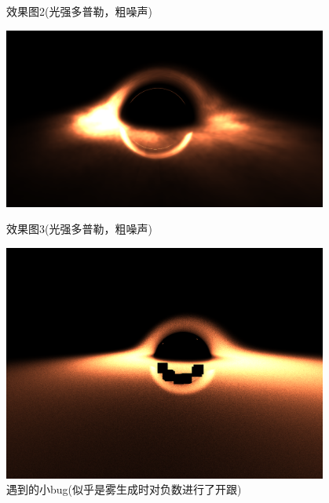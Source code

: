 \documentclass[a4paper, 12pt]{article}
\begin{document}
\begin{figure}[H]
\begin{minipage}[t]{0.48\textwidth}
            \caption{效果图2(光强多普勒，粗噪声)}
        \end{minipage}
        \hfill
        \begin{minipage}[t]{0.48\textwidth}
            \centering
            \includegraphics[width=0.95\textwidth]{photo/perlin1.png}
            \caption{效果图3(光强多普勒，粗噪声)}
        \end{minipage}
        \hfill
        \begin{minipage}[t]{0.48\textwidth}
            \centering
            \includegraphics[width=0.95\textwidth]{photo/bug0.png}
            \caption{遇到的小bug(似乎是雾生成时对负数进行了开跟)}
        \end{minipage}
        
    \end{figure}
\end{document}
